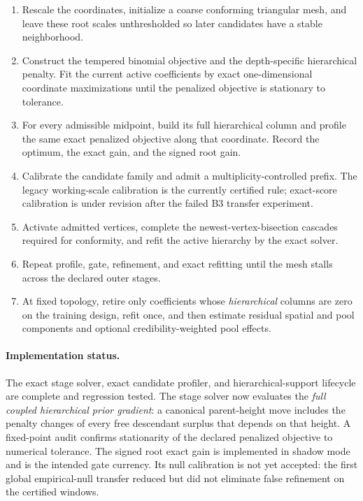 \documentclass[11pt]{article}
\begin{document}
\begin{enumerate}[leftmargin=2em,itemsep=2pt]
\item Rescale the coordinates, initialize a coarse conforming triangular mesh, and leave these root
scales unthresholded so later candidates have a stable neighborhood.
\item Construct the tempered binomial objective and the depth-specific hierarchical penalty. Fit the
current active coefficients by exact one-dimensional coordinate maximizations until the penalized
objective is stationary to tolerance.
\item For every admissible midpoint, build its full hierarchical column and profile the same exact
penalized objective along that coordinate. Record the optimum, the exact gain, and the signed root
gain.
\item Calibrate the candidate family and admit a multiplicity-controlled prefix. The legacy
working-scale calibration is the currently certified rule; exact-score calibration is under
revision after the failed B3 transfer experiment.
\item Activate admitted vertices, complete the newest-vertex-bisection cascades required for
conformity, and refit the active hierarchy by the exact solver.
\item Repeat profile, gate, refinement, and exact refitting until the mesh stalls across the declared
outer stages.
\item At fixed topology, retire only coefficients whose \emph{hierarchical} columns are zero on the
training design, refit once, and then estimate residual spatial and pool components and optional
credibility-weighted pool effects.
\end{enumerate}

\paragraph{Implementation status.} The exact stage solver, exact candidate profiler, and
hierarchical-support lifecycle are complete and regression tested. The stage solver now evaluates
the \emph{full coupled hierarchical prior gradient}: a canonical parent-height move includes the
penalty changes of every free descendant surplus that depends on that height. A fixed-point audit
confirms stationarity of the declared penalized objective to numerical tolerance. The signed root
exact gain is implemented in shadow mode and is the intended gate currency. Its null calibration is
not yet accepted: the first global empirical-null transfer reduced but did not eliminate false
refinement on the certified windows.
\end{document}

